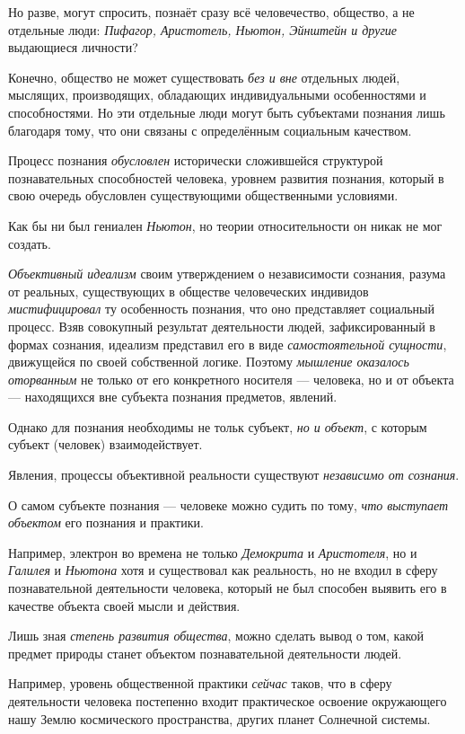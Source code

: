 \documentclass[a4paper,14pt,russian]{extreport}
\begin{document}
Но разве, могут спросить, познаёт сразу всё человечество, общество, а не отдельные люди: \emph{Пифагор, Аристотель, Ньютон, Эйнштейн и другие} выдающиеся личности?

Конечно, общество не может существовать \emph{без и вне} отдельных людей, мыслящих, производящих, обладающих индивидуальными особенностями и способностями. Но эти отдельные люди могут быть субъектами познания лишь благодаря тому, что они связаны с определённым социальным качеством.

Процесс познания \emph{обусловлен} исторически сложившейся структурой познавательных способностей человека, уровнем развития познания, который в свою очередь обусловлен существующими общественными условиями.

Как бы ни был гениален \emph{Ньютон}, но теории относительности он никак не мог создать.

\emph{Объективный идеализм} своим утверждением о независимости сознания, разума от реальных, существующих в обществе человеческих индивидов \emph{мистифицировал} ту особенность познания, что оно представляет социальный процесс. Взяв совокупный результат деятельности людей, зафиксированный в формах сознания, идеализм представил его в виде \emph{самостоятельной сущности}, движущейся по своей собственной логике. Поэтому \emph{мышление оказалось оторванным} не только от его конкретного носителя --- человека, но и от объекта --- находящихся вне субъекта познания предметов, явлений.

Однако для познания необходимы не тольк субъект, \emph{но и объект}, с которым субъект (человек) взаимодействует.

Явления, процессы объективной реальности существуют \emph{независимо от сознания}.

О самом субъекте познания --- человеке можно судить по тому, \emph{что выступает объектом} его познания и практики.

Например, электрон во времена не только \emph{Демокрита} и \emph{Аристотеля}, но и \emph{Галилея} и \emph{Ньютона} хотя и существовал как реальность, но не входил в сферу познавательной деятельности человека, который не был способен выявить его в качестве объекта своей мысли и действия.

Лишь зная \emph{степень развития общества}, можно сделать вывод о том, какой предмет природы станет объектом познавательной деятельности людей.

Например, уровень общественной практики \emph{сейчас} таков, что в сферу деятельности человека постепенно входит практическое освоение окружающего нашу Землю космического пространства, других планет Солнечной системы.
\end{document}
